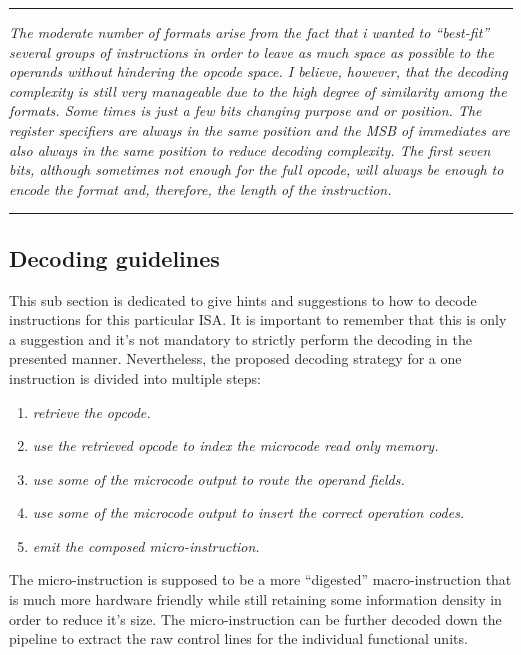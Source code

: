         \par\noindent\rule{\textwidth}{0.4pt}
        \textit{The moderate number of formats arise from the fact that i wanted to ``best-fit'' several groups of instructions in order to leave as much space as possible to the operands without hindering the opcode space. I believe, however, that the decoding complexity is still very manageable due to the high degree of similarity among the formats. Some times is just a few bits changing purpose and or position. The register specifiers are always in the same position and the MSB of immediates are also always in the same position to reduce decoding complexity. The first seven bits, although sometimes not enough for the full opcode, will always be enough to encode the format and, therefore, the length of the instruction.}
        \par\noindent\rule{\textwidth}{0.4pt}

        \subsection{Decoding guidelines}

            \vspace{10pt}

            This sub section is dedicated to give hints and suggestions to how to decode instructions for this particular ISA. It is important to remember that this is only a suggestion and it's not mandatory to strictly perform the decoding in the presented manner. Nevertheless, the proposed decoding strategy for a one instruction is divided into multiple steps:

            \begin{enumerate}

                \item \textit{retrieve the opcode.}
                \item \textit{use the retrieved opcode to index the microcode read only memory.}
                \item \textit{use some of the microcode output to route the operand fields.}
                \item \textit{use some of the microcode output to insert the correct operation codes.}
                \item \textit{emit the composed micro-instruction.}

            \end{enumerate}

            The micro-instruction is supposed to be a more ``digested'' macro-instruction that is much more hardware friendly while still retaining some information density in order to reduce it's size. The micro-instruction can be further decoded down the pipeline to extract the raw control lines for the individual functional units.


